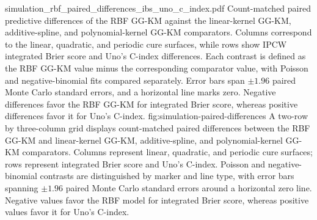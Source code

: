 \GGKMWideFigure
{simulation_rbf_paired_differences_ibs_uno_c_index.pdf}
{Count-matched paired predictive differences of the RBF GG-KM against the linear-kernel GG-KM, additive-spline, and polynomial-kernel GG-KM comparators. Columns correspond to the linear, quadratic, and periodic cure surfaces, while rows show IPCW integrated Brier score and Uno's C-index differences. Each contrast is defined as the RBF GG-KM value minus the corresponding comparator value, with Poisson and negative-binomial fits compared separately. Error bars span $\pm1.96$ paired Monte Carlo standard errors, and a horizontal line marks zero. Negative differences favor the RBF GG-KM for integrated Brier score, whereas positive differences favor it for Uno's C-index.}
{fig:simulation-paired-differences}
{
A two-row by three-column grid displays count-matched paired
differences between the RBF GG-KM and linear-kernel GG-KM,
additive-spline, and polynomial-kernel GG-KM comparators. Columns
represent linear, quadratic, and periodic cure surfaces; rows represent
integrated Brier score and Uno's C-index.
Poisson and negative-binomial contrasts are distinguished by marker and
line type, with error bars spanning $\pm1.96$ paired Monte Carlo standard
errors around a horizontal zero line. Negative values favor the RBF model
for integrated Brier score, whereas positive values favor it for Uno's C-index.
}

